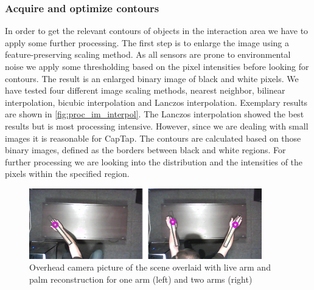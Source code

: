 \subsubsection{Acquire and optimize contours}
In order to get the relevant contours of objects in the interaction area we have to apply some further processing. The first step is to enlarge the image using a feature-preserving scaling method. As all sensors are prone to environmental noise we apply some thresholding based on the pixel intensities before looking for contours. The result is an enlarged binary image of black and white pixels. We have tested four different image scaling methods, nearest neighbor, bilinear interpolation, bicubic interpolation and Lanczos interpolation. Exemplary results are shown in \ref{fig:proc_im_interpol}. The Lanczos interpolation showed the best results but is most processing intensive. However, since we are dealing with small images it is reasonable for CapTap. The contours are calculated based on those binary images, defined as the borders between black and white regions. For further processing we are looking into the distribution and the intensities of the pixels within the specified region.
\begin{figure}[h]
\centering
\includegraphics[width=0.9\textwidth]{images/proc_im_arms}
\caption{Overhead camera picture of the scene overlaid with live arm and palm reconstruction for one arm (left) and two arms (right)}
\label{fig:proc_im_arms}
\end{figure}


